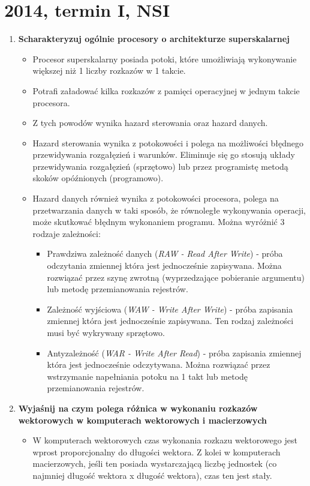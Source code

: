 	\section{2014, termin I, NSI}
		\begin{enumerate}
			\item \textbf{Scharakteryzuj ogólnie procesory o architekturze superskalarnej}
			\begin{itemize}
				\item Procesor superskalarny posiada potoki, które umożliwiają wykonywanie większej niż 1 liczby rozkazów w 1 takcie.
				\item Potrafi załadować kilka rozkazów z pamięci operacyjnej w jednym takcie procesora.
				\item Z tych powodów wynika hazard sterowania oraz hazard danych.
				\item Hazard sterowania wynika z potokowości i polega na możliwości błędnego przewidywania rozgałęzień i warunków. Eliminuje się go stosują układy przewidywania rozgałęzień (sprzętowo) lub przez programistę metodą skoków opóźnionych (programowo).
				\item Hazard danych również wynika z potokowości procesora, polega na przetwarzania danych w taki sposób, że równoległe wykonywania operacji, może skutkować błędnym wykonaniem programu. Można wyróżnić 3 rodzaje zależności:
				\begin{itemize}
					\item Prawdziwa zależność danych (\emph{RAW - Read After Write}) - próba odczytania zmiennej która jest jednocześnie zapisywana. Można rozwiązać przez szynę zwrotną (wyprzedzające pobieranie argumentu) lub metodę przemianowania rejestrów.
					\item Zależność wyjściowa (\emph{WAW - Write After Write}) - próba zapisania zmiennej która jest jednocześnie zapisywana. Ten rodzaj zależności musi być wykrywany sprzętowo.
					\item Antyzależność (\emph{WAR - Write After Read}) - próba zapisania zmiennej która jest jednocześnie odczytywana. Można rozwiązać przez wstrzymanie napełniania potoku na 1 takt lub metodę przemianowania rejestrów.
				\end{itemize}
			\end{itemize}
			\item \textbf{Wyjaśnij na czym polega różnica w wykonaniu rozkazów wektorowych w komputerach wektorowych i macierzowych}
			\begin{itemize}
				\item W komputerach wektorowych czas wykonania rozkazu wektorowego jest wprost proporcjonalny do długości wektora. Z kolei w komputerach macierzowych, jeśli ten posiada wystarczającą liczbę jednostek (co najmniej długość wektora x długość wektora), czas ten jest stały.

\end{itemize}
\end{enumerate}
